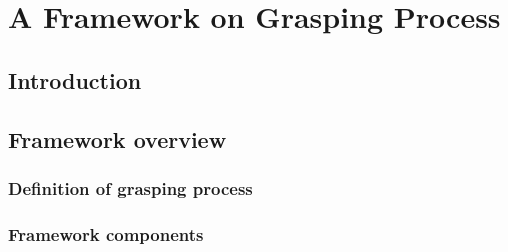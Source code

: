 
\chapter{A Framework on Grasping Process}
	
	
\section{Introduction}


\section{Framework overview}

\subsection{Definition of grasping process}


\subsection{Framework components}

